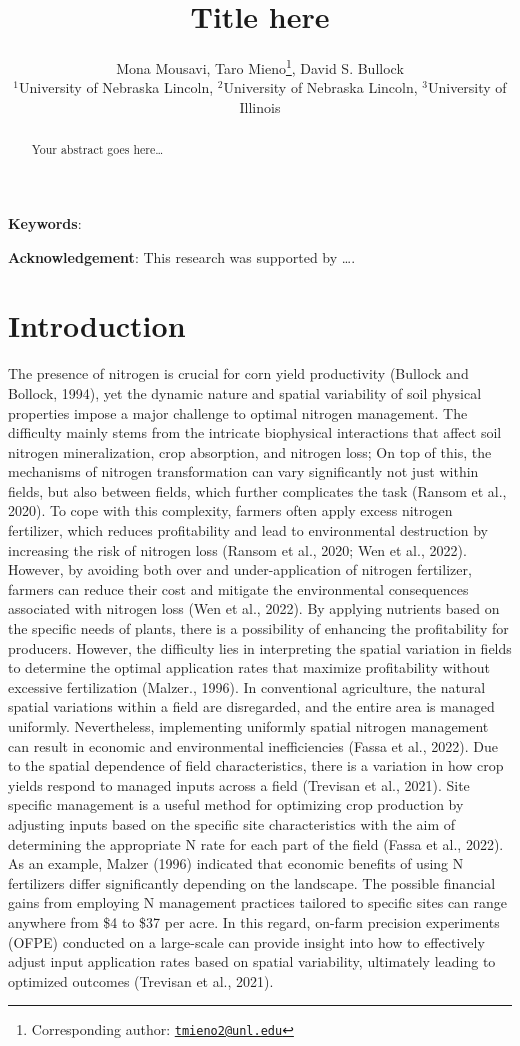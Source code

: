 \documentclass[
  12pt,
]{article}
\title{Title here}
\author{Mona Mousavi, Taro Mieno\footnote{Corresponding author: \href{mailto:tmieno2@unl.edu}{\nolinkurl{tmieno2@unl.edu}}}, David S. Bullock\\
\(^1\)University of Nebraska Lincoln, \(^2\)University of Nebraska Lincoln, \(^3\)University of Illinois}
\date{}
\begin{document}
\maketitle
\begin{abstract}
Your abstract goes here\ldots{}
\end{abstract}

\textbf{Keywords}:

\textbf{Acknowledgement}: This research was supported by \ldots.

\hypertarget{introduction}{%
\section{Introduction}\label{introduction}}

The presence of nitrogen is crucial for corn yield productivity (Bullock and Bollock, 1994), yet the dynamic nature and spatial variability of soil physical properties impose a major challenge to optimal nitrogen management. The difficulty mainly stems from the intricate biophysical interactions that affect soil nitrogen mineralization, crop absorption, and nitrogen loss; On top of this, the mechanisms of nitrogen transformation can vary significantly not just within fields, but also between fields, which further complicates the task (Ransom et al., 2020). To cope with this complexity, farmers often apply excess nitrogen fertilizer, which reduces profitability and lead to environmental destruction by increasing the risk of nitrogen loss (Ransom et al., 2020; Wen et al., 2022). However, by avoiding both over and under-application of nitrogen fertilizer, farmers can reduce their cost and mitigate the environmental consequences associated with nitrogen loss (Wen et al., 2022). By applying nutrients based on the specific needs of plants, there is a possibility of enhancing the profitability for producers. However, the difficulty lies in interpreting the spatial variation in fields to determine the optimal application rates that maximize profitability without excessive fertilization (Malzer., 1996). In conventional agriculture, the natural spatial variations within a field are disregarded, and the entire area is managed uniformly. Nevertheless, implementing uniformly spatial nitrogen management can result in economic and environmental inefficiencies (Fassa et al., 2022). Due to the spatial dependence of field characteristics, there is a variation in how crop yields respond to managed inputs across a field (Trevisan et al., 2021). Site specific management is a useful method for optimizing crop production by adjusting inputs based on the specific site characteristics with the aim of determining the appropriate N rate for each part of the field (Fassa et al., 2022). As an example, Malzer (1996) indicated that economic benefits of using N fertilizers differ significantly depending on the landscape. The possible financial gains from employing N management practices tailored to specific sites can range anywhere from \$4 to \$37 per acre. In this regard, on-farm precision experiments (OFPE) conducted on a large-scale can provide insight into how to effectively adjust input application rates based on spatial variability, ultimately leading to optimized outcomes (Trevisan et al., 2021).
\end{document}

